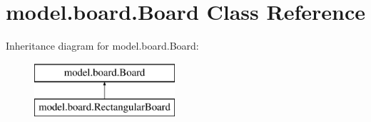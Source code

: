 \hypertarget{classmodel_1_1board_1_1_board}{\section{model.\-board.\-Board Class Reference}
\label{classmodel_1_1board_1_1_board}
}
Inheritance diagram for model.\-board.\-Board\-:\begin{figure}[H]
\begin{center}
\leavevmode
\includegraphics[height=2.000000cm]{classmodel_1_1board_1_1_board}
\end{center}
\end{figure}
